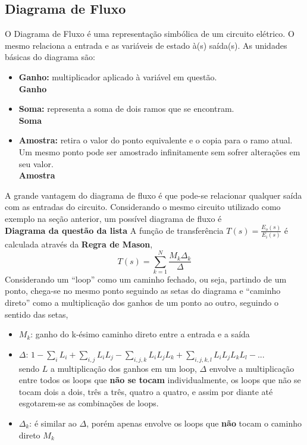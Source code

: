 \documentclass{article}
\numberwithin{equation}{section}
\begin{document}
\subsection{Diagrama de Fluxo}
\label{subsec:fluxo}
O Diagrama de Fluxo é uma representação simbólica de um circuito elétrico. O mesmo relaciona a entrada e as variáveis de estado à(s) saída(s). As unidades básicas do diagrama são:
\begin{itemize}
    \item \textbf{Ganho:} multiplicador aplicado à variável em questão. \\
    \textbf{Ganho}
    \item \textbf{Soma:} representa a soma de dois ramos que se encontram. \\
    \textbf{Soma}
    \item \textbf{Amostra:} retira o valor do ponto equivalente e o copia para o ramo atual. Um mesmo ponto pode ser amostrado infinitamente sem sofrer alterações em seu valor. \\
    \textbf{Amostra}
\end{itemize}
A grande vantagem do diagrama de fluxo é que pode-se relacionar qualquer saída com as entradas do circuito. Considerando o mesmo circuito utilizado como exemplo na seção anterior, um possível diagrama de fluxo é \\
%
\textbf{Diagrama da questão da lista}
A função de transferência $T(s)=\displaystyle{\frac{E_{o}(s)}{E_{i}(s)}}$ é calculada através da \textbf{Regra de Mason},
$$T(s) = \sum_{k=1}^{N} \frac{M_{k}\Delta_{k}}{\Delta} $$
Considerando um ``loop'' como um caminho fechado, ou seja, partindo de um ponto, chega-se no mesmo ponto seguindo as setas do diagrama e ``caminho direto'' como a multiplicação dos ganhos de um ponto ao outro, seguindo o sentido das setas,
\begin{itemize}
    \item $M_{k}$: ganho do k-ésimo caminho direto entre a entrada e a saída
    \item $\Delta$: $1 - \displaystyle{\sum_{i}L_{i}} + \displaystyle{\sum_{i,j}L_{i}L_{j}} - \displaystyle{\sum_{i,j,k}L_{i}L_{j}L_{k}} + \displaystyle{\sum_{i,j,k,l}L_{i}L_{j}L_{k}L_{l}} - ...  $ \\ sendo $L$ a multiplicação dos ganhos em um loop, $\Delta$ envolve a multiplicação entre todos os loops que \textbf{não se tocam} individualmente, os loops que não se tocam dois a dois, três a três, quatro a quatro, e assim por diante até esgotarem-se as combinações de loops.
    \item $\Delta_{k}$: é similar ao $\Delta$, porém apenas envolve os loops que \textbf{não} tocam o caminho direto $M_{k}$
\end{itemize}
\end{document}
